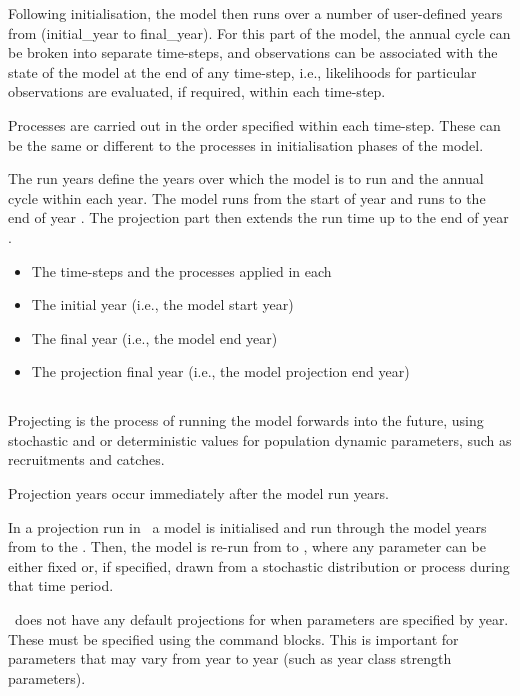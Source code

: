 Following initialisation, the model then runs over a number of user-defined years from (initial\_year to final\_year). For this part of the model, the annual cycle can be broken into separate time-steps, and observations can be associated with the state of the model at the end of any time-step, i.e., likelihoods for particular observations are evaluated, if required, within each time-step. 

Processes are carried out in the order specified within each time-step. These can be the same or different to the processes in initialisation phases of the model. 

The run years define the years over which the model is to run and the annual cycle within each year. The model runs from the start of year  and runs to the end of year . The projection part then extends the run time up to the end of year . 
\begin{itemize}
  \item The time-steps and the processes applied in each
  \item The initial year (i.e., the model start year)
  \item The final year (i.e., the model end year)
  \item The projection final year (i.e., the model projection end year)
\end{itemize}

\subsection{}\label{sec:projection}

Projecting is the process of running the model forwards into the future, using stochastic and or deterministic values for population dynamic parameters, such as recruitments and catches.

Projection years occur immediately after the model run years.

In a projection run in \CNAME\, a model is initialised and run through the model years from  to the . Then, the model is re-run from  to , where any parameter can be either fixed or, if specified, drawn from a stochastic distribution or process during that time period. 

\CNAME\ does not have any default projections for when parameters are specified by year. These must be specified using the  command blocks. This is important for parameters that may vary from year to year (such as year class strength parameters). 

